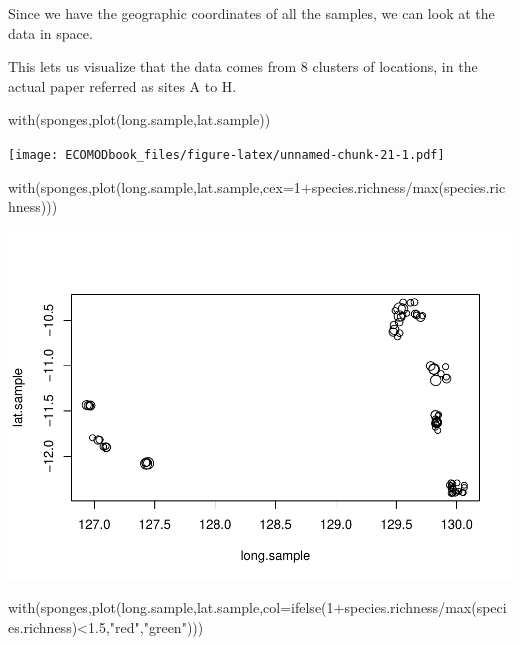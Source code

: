 \documentclass[
]{book}
\newenvironment{Shaded}{\begin{snugshade}}{\end{snugshade}}
\newcommand{\AttributeTok}[1]{\textcolor[rgb]{0.77,0.63,0.00}{#1}}
\newcommand{\DecValTok}[1]{\textcolor[rgb]{0.00,0.00,0.81}{#1}}
\newcommand{\FloatTok}[1]{\textcolor[rgb]{0.00,0.00,0.81}{#1}}
\newcommand{\FunctionTok}[1]{\textcolor[rgb]{0.00,0.00,0.00}{#1}}
\newcommand{\NormalTok}[1]{#1}
\newcommand{\SpecialCharTok}[1]{\textcolor[rgb]{0.00,0.00,0.00}{#1}}
\newcommand{\StringTok}[1]{\textcolor[rgb]{0.31,0.60,0.02}{#1}}
\begin{document}
Since we have the geographic coordinates of all the samples, we can look at the data in space.

This lets us visualize that the data comes from 8 clusters of locations, in the actual paper referred as sites A to H.

\begin{Shaded}
\begin{Highlighting}[]
\FunctionTok{with}\NormalTok{(sponges,}\FunctionTok{plot}\NormalTok{(long.sample,lat.sample)) }
\end{Highlighting}
\end{Shaded}

\texttt{[image: ECOMODbook\_files/figure-latex/unnamed-chunk-21-1.pdf]}

\begin{Shaded}
\begin{Highlighting}[]
\FunctionTok{with}\NormalTok{(sponges,}\FunctionTok{plot}\NormalTok{(long.sample,lat.sample,}\AttributeTok{cex=}\DecValTok{1}\SpecialCharTok{+}\NormalTok{species.richness}\SpecialCharTok{/}\FunctionTok{max}\NormalTok{(species.richness))) }
\end{Highlighting}
\end{Shaded}

\includegraphics{ECOMODbook_files/figure-latex/unnamed-chunk-21-2.pdf}

\begin{Shaded}
\begin{Highlighting}[]
\FunctionTok{with}\NormalTok{(sponges,}\FunctionTok{plot}\NormalTok{(long.sample,lat.sample,}\AttributeTok{col=}\FunctionTok{ifelse}\NormalTok{(}\DecValTok{1}\SpecialCharTok{+}\NormalTok{species.richness}\SpecialCharTok{/}\FunctionTok{max}\NormalTok{(species.richness)}\SpecialCharTok{\textless{}}\FloatTok{1.5}\NormalTok{,}\StringTok{"red"}\NormalTok{,}\StringTok{"green"}\NormalTok{))) }
\end{Highlighting}
\end{Shaded}
\end{document}
